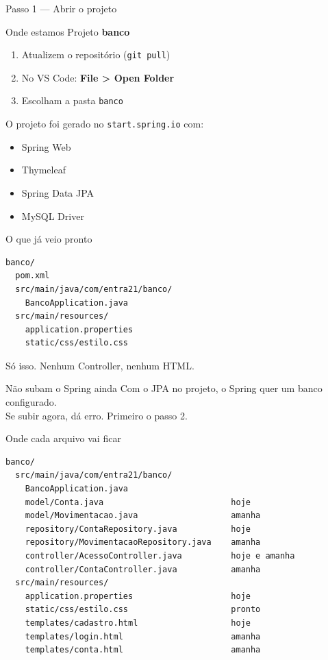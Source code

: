 \documentclass[aspectratio=169,11pt]{beamer}
\newcommand{\onde}[1]{%
  \begin{block}{Onde estamos}
    #1
  \end{block}
}
\begin{document}
\begin{frame}{Passo 1 --- Abrir o projeto}
  \onde{Projeto \textbf{banco}}

  \begin{enumerate}
    \item Atualizem o repositório (\texttt{git pull})
    \item No VS Code: \textbf{File > Open Folder}
    \item Escolham a pasta \texttt{banco}
  \end{enumerate}

  \vspace{0.5em}
  O projeto foi gerado no \texttt{start.spring.io} com:
  \begin{itemize}
    \item Spring Web
    \item Thymeleaf
    \item Spring Data JPA
    \item MySQL Driver
  \end{itemize}
\end{frame}

\begin{frame}[fragile]{O que já veio pronto}
\begin{lstlisting}[basicstyle=\ttfamily\footnotesize]
banco/
  pom.xml
  src/main/java/com/entra21/banco/
    BancoApplication.java
  src/main/resources/
    application.properties
    static/css/estilo.css
\end{lstlisting}

  \vspace{0.4em}
  Só isso. Nenhum Controller, nenhum HTML.

  \vspace{0.4em}
  \begin{alertblock}{Não subam o Spring ainda}
    Com o JPA no projeto, o Spring quer um banco configurado.\\
    Se subir agora, dá erro. Primeiro o passo 2.
  \end{alertblock}
\end{frame}

\begin{frame}[fragile]{Onde cada arquivo vai ficar}
\begin{lstlisting}[basicstyle=\ttfamily\scriptsize]
banco/
  src/main/java/com/entra21/banco/
    BancoApplication.java
    model/Conta.java                          hoje
    model/Movimentacao.java                   amanha
    repository/ContaRepository.java           hoje
    repository/MovimentacaoRepository.java    amanha
    controller/AcessoController.java          hoje e amanha
    controller/ContaController.java           amanha
  src/main/resources/
    application.properties                    hoje
    static/css/estilo.css                     pronto
    templates/cadastro.html                   hoje
    templates/login.html                      amanha
    templates/conta.html                      amanha
\end{lstlisting}
\end{frame}
\end{document}
